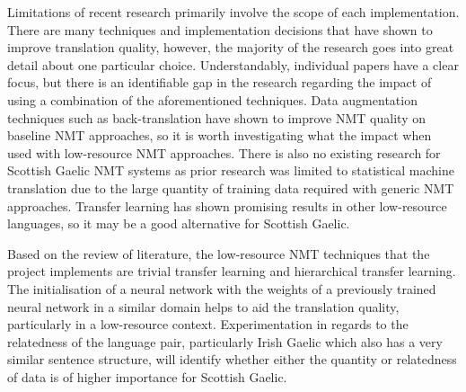 Limitations of recent research primarily involve the scope of each implementation. There are many techniques and implementation decisions that have shown to improve translation quality, however, the majority of the research goes into great detail about one particular choice. Understandably, individual papers have a clear focus, but there is an identifiable gap in the research regarding the impact of using a combination of the aforementioned techniques. Data augmentation techniques such as back-translation have shown to improve \acrshort{NMT} quality on baseline \acrshort{NMT} approaches, so it is worth investigating what the impact when used with low-resource \acrshort{NMT} approaches. There is also no existing research for Scottish Gaelic \acrshort{NMT} systems as prior research was limited to statistical machine translation due to the large quantity of training data required with generic \acrshort{NMT} approaches. Transfer learning has shown promising results in other low-resource languages, so it may be a good alternative for Scottish Gaelic.

Based on the review of literature, the low-resource \acrshort{NMT} techniques that the project implements are trivial transfer learning and hierarchical transfer learning. The initialisation of a neural network with the weights of a previously trained neural network in a similar domain helps to aid the translation quality, particularly in a low-resource context. Experimentation in regards to the relatedness of the language pair, particularly Irish Gaelic which also has a very similar sentence structure, will identify whether either the quantity or relatedness of data is of higher importance for Scottish Gaelic.
